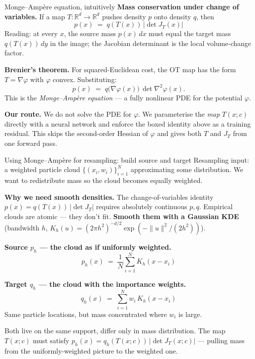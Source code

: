 \documentclass[10pt,aspectratio=169]{beamer}
\newcommand{\R}{\mathbb{R}}
\begin{document}
\begin{frame}{Monge--Amp\`ere equation, intuitively}
  \textbf{Mass conservation under change of variables.} If a map $T : \R^d \to \R^d$ pushes density $p$ onto density $q$, then
  \[
    \boxed{\;p(x) \;=\; q(T(x)) \,\big|\det J_T(x)\big|\;}
  \]
  Reading: at every $x$, the source mass $p(x)\,dx$ must equal the target mass $q(T(x))\,dy$ in the image; the Jacobian determinant is the local volume-change factor.

  \medskip
  \textbf{Brenier's theorem.} For squared-Euclidean cost, the OT map has the form $T = \nabla\varphi$ with $\varphi$ convex. Substituting:
  \[
    p(x) \;=\; q\big(\nabla\varphi(x)\big)\, \det \nabla^2\varphi(x).
  \]
  This is the \emph{Monge--Amp\`ere equation} --- a fully nonlinear PDE for the potential $\varphi$.

  \medskip
  \textbf{Our route.} We do not solve the PDE for $\varphi$. We parameterise the \emph{map} $T(x; c)$ directly with a neural network and enforce the boxed identity above as a training residual. This skips the second-order Hessian of $\varphi$ and gives both $T$ and $J_T$ from one forward pass.
\end{frame}

\begin{frame}{Using Monge--Amp\`ere for resampling: build source and target}
  Resampling input: a weighted particle cloud $\{(x_i, w_i)\}_{i=1}^N$ approximating some distribution. We want to redistribute mass so the cloud becomes equally weighted.

  \medskip
  \textbf{Why we need smooth densities.} The change-of-variables identity $p(x) = q(T(x))\,|\det J_T|$ requires absolutely continuous $p, q$. Empirical clouds are atomic --- they don't fit. \textbf{Smooth them with a Gaussian KDE} (bandwidth $h$, $K_h(u) = (2\pi h^2)^{-d/2}\exp(-\|u\|^2/(2h^2))$).

  \medskip
  \textbf{Source $p_h$ --- the cloud as if uniformly weighted.}
  \[
    p_h(x) \;=\; \frac{1}{N} \sum_{i=1}^N K_h(x - x_i)
  \]

  \medskip
  \textbf{Target $q_h$ --- the cloud with the importance weights.}
  \[
    q_h(x) \;=\; \sum_{i=1}^N w_i\, K_h(x - x_i)
  \]
  Same particle locations, but mass concentrated where $w_i$ is large.

  \medskip
  Both live on the same support, differ only in mass distribution. The map $T(x;c)$ must satisfy $p_h(x) = q_h(T(x;c))\,|\det J_T(x;c)|$ --- pulling mass from the uniformly-weighted picture to the weighted one.
\end{frame}
\end{document}

